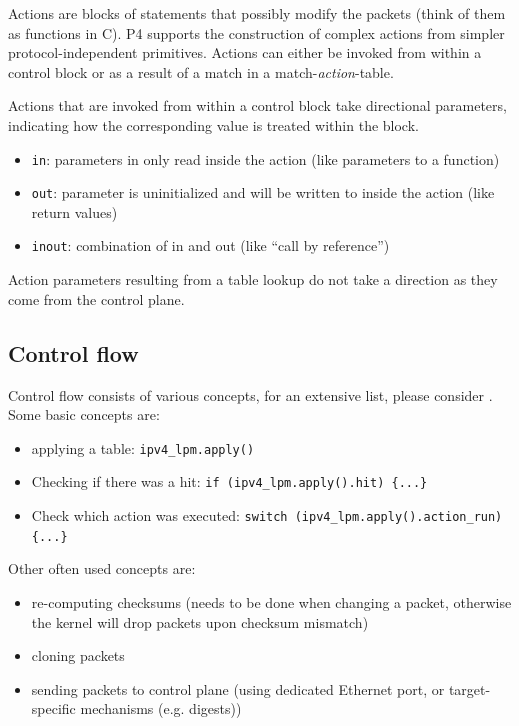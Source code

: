 \documentclass[11pt,oneside,a4paper]{article}
\begin{document}
Actions are blocks of statements that possibly modify the packets (think of them as functions in C). P4 supports the construction of complex actions from simpler protocol-independent primitives. Actions can either be invoked from within a control block or as a result of a match in a match-\textit{action}-table.

\newpage

\noindent Actions that are invoked from within a control block take directional parameters, indicating how the corresponding value is treated within the block.
\vspace{-\topsep}
\begin{itemize}
	\setlength{\itemsep}{0pt}
	\setlength{\parskip}{0pt}
	\item \texttt{in}: parameters in only read inside the action (like parameters to a function)
	\item \texttt{out}: parameter is uninitialized and will be written to inside the action (like return values)
	\item \texttt{inout}: combination of in and out (like “call by reference”)
\end{itemize}


\noindent Action parameters resulting from a table lookup do not take a direction as they come from the control plane.

\subsection{Control flow}

Control flow consists of various concepts, for an extensive list, please consider \cite{p416spec}. Some basic concepts are:
\vspace{-\topsep}
\begin{itemize}
	\setlength{\itemsep}{0pt}
	\setlength{\parskip}{0pt}
	\item applying a table: \texttt{ipv4\_lpm.apply()}
	\item Checking if there was a hit: \texttt{if (ipv4\_lpm.apply().hit) \{...\}}
	\item Check which action was executed: \texttt{switch (ipv4\_lpm.apply().action\_run) \{...\}}
\end{itemize}

\noindent Other often used concepts are: 
\vspace{-\topsep}
\begin{itemize}
	\setlength{\itemsep}{0pt}
	\setlength{\parskip}{0pt}
	\item re-computing checksums (needs to be done when changing a packet, otherwise the kernel will drop packets upon checksum mismatch)
	\item cloning packets
	\item sending packets to control plane (using dedicated Ethernet port, or target-specific mechanisms (e.g. digests))
\end{itemize}
\end{document}
